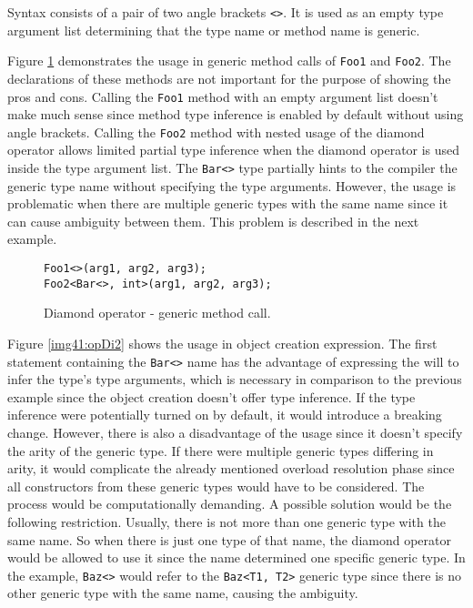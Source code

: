 Syntax consists of a pair of two angle brackets \texttt{<>}.
It is used as an empty type argument list determining that the type name or method name is generic.
\par
Figure \ref{img40:opDi1} demonstrates the usage in generic method calls of \texttt{Foo1} and \texttt{Foo2}. 
The declarations of these methods are not important for the purpose of showing the pros and cons. 
Calling the \texttt{Foo1} method with an empty argument list doesn’t make much sense since method type inference is enabled by default without using angle brackets. 
Calling the \texttt{Foo2} method with nested usage of the diamond operator allows limited partial type inference when the diamond operator is used inside the type argument list. 
The \texttt{Bar<>} type partially hints to the compiler the generic type name without specifying the type arguments. 
However, the usage is problematic when there are multiple generic types with the same name since it can cause ambiguity between them. 
This problem is described in the next example.
\begin{figure}[h]
\begin{lstlisting}[style=csharp]
Foo1<>(arg1, arg2, arg3);
Foo2<Bar<>, int>(arg1, arg2, arg3);
\end{lstlisting}
\caption{Diamond operator - generic method call.}
\label{img40:opDi1}
\end{figure}
\par
Figure \ref{img41:opDi2} shows the usage in object creation expression. 
The first statement containing the \texttt{Bar<>} name has the advantage of expressing the will to infer the type’s type arguments, which is necessary in comparison to the previous example since the object creation doesn’t offer type inference. 
If the type inference were potentially turned on by default, it would introduce a breaking change. 
However, there is also a disadvantage of the usage since it doesn’t specify the arity of the generic type. If there were multiple generic types differing in arity, it would complicate the already mentioned overload resolution phase since all constructors from these generic types would have to be considered. The process would be computationally demanding. 
A possible solution would be the following restriction. 
Usually, there is not more than one generic type with the same name. 
So when there is just one type of that name, the diamond operator would be allowed to use it since the name determined one specific generic type. 
In the example, \texttt{Baz<>} would refer to the \texttt{Baz<T1, T2>} generic type since there is no other generic type with the same name, causing the ambiguity.
